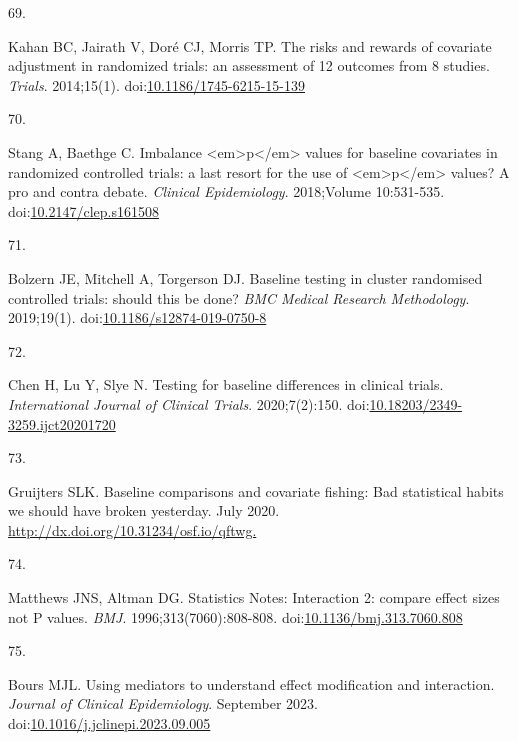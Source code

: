 \documentclass[
]{book}
\newlength{\cslhangindent}
\newlength{\csllabelwidth}
\newlength{\cslentryspacingunit} %
\newenvironment{CSLReferences}[2] %
 {%
  \setlength{\parindent}{0pt}
  \ifodd #1
  \let\oldpar\par
  \def\par{\hangindent=\cslhangindent\oldpar}
  \fi
  \setlength{\parskip}{#2\cslentryspacingunit}
 }%
 {}
\newcommand{\CSLLeftMargin}[1]{\parbox[t]{\csllabelwidth}{#1}}
\newcommand{\CSLRightInline}[1]{\parbox[t]{\linewidth - \csllabelwidth}{#1}\break}
\begin{document}
\begin{CSLReferences}{0}{0}
\leavevmode{}%
\CSLLeftMargin{69. }%
\CSLRightInline{Kahan BC, Jairath V, Doré CJ, Morris TP. The risks and rewards of covariate adjustment in randomized trials: an assessment of 12 outcomes from 8 studies. \emph{Trials}. 2014;15(1). doi:\href{https://doi.org/10.1186/1745-6215-15-139}{10.1186/1745-6215-15-139}}

\leavevmode{}%
\CSLLeftMargin{70. }%
\CSLRightInline{Stang A, Baethge C. Imbalance \textless em\textgreater p\textless/em\textgreater{} values for baseline covariates in randomized controlled trials: a last resort for the use of \textless em\textgreater p\textless/em\textgreater{} values? A pro and contra debate. \emph{Clinical Epidemiology}. 2018;Volume 10:531-535. doi:\href{https://doi.org/10.2147/clep.s161508}{10.2147/clep.s161508}}

\leavevmode{}%
\CSLLeftMargin{71. }%
\CSLRightInline{Bolzern JE, Mitchell A, Torgerson DJ. Baseline testing in cluster randomised controlled trials: should this be done? \emph{BMC Medical Research Methodology}. 2019;19(1). doi:\href{https://doi.org/10.1186/s12874-019-0750-8}{10.1186/s12874-019-0750-8}}

\leavevmode{}%
\CSLLeftMargin{72. }%
\CSLRightInline{Chen H, Lu Y, Slye N. Testing for baseline differences in clinical trials. \emph{International Journal of Clinical Trials}. 2020;7(2):150. doi:\href{https://doi.org/10.18203/2349-3259.ijct20201720}{10.18203/2349-3259.ijct20201720}}

\leavevmode{}%
\CSLLeftMargin{73. }%
\CSLRightInline{Gruijters SLK. Baseline comparisons and covariate fishing: Bad statistical habits we should have broken yesterday. July 2020. \href{http://dx.doi.org/10.31234/osf.io/qftwg}{http://dx.doi.org/10.31234/osf.io/qftwg.}}

\leavevmode{}%
\CSLLeftMargin{74. }%
\CSLRightInline{Matthews JNS, Altman DG. Statistics Notes: Interaction 2: compare effect sizes not P values. \emph{BMJ}. 1996;313(7060):808-808. doi:\href{https://doi.org/10.1136/bmj.313.7060.808}{10.1136/bmj.313.7060.808}}

\leavevmode{}%
\CSLLeftMargin{75. }%
\CSLRightInline{Bours MJL. Using mediators to understand effect modification and interaction. \emph{Journal of Clinical Epidemiology}. September 2023. doi:\href{https://doi.org/10.1016/j.jclinepi.2023.09.005}{10.1016/j.jclinepi.2023.09.005}}


\end{CSLReferences}
\end{document}
